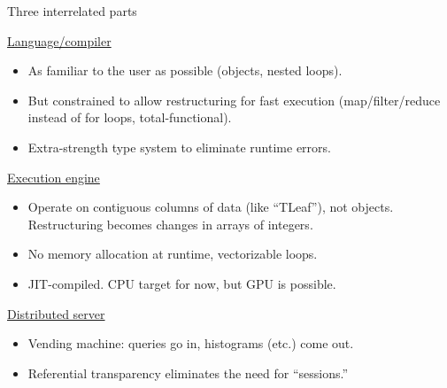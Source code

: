 \documentclass{beamer}
\begin{document}
\begin{frame}{Three interrelated parts}
\vspace{0.15 cm}
\begin{block}{\underline{Language/compiler}}
\vspace{-0.1 cm}
\begin{itemize}
\item As familiar to the user as possible (objects, nested loops).
\item But constrained to allow restructuring for fast execution (map/filter/reduce instead of for loops, total-functional).
\item Extra-strength type system to eliminate runtime errors.
\end{itemize}
\end{block}

\vspace{-0.2 cm}
\begin{block}{\underline{Execution engine}}
\vspace{-0.1 cm}
\begin{itemize}
\item Operate on contiguous columns of data (like ``TLeaf''), not objects. Restructuring becomes changes in arrays of integers.
\item No memory allocation at runtime, vectorizable loops.
\item JIT-compiled. CPU target for now, but GPU is possible.
\end{itemize}
\end{block}

\vspace{-0.2 cm}
\begin{block}{\underline{Distributed server}}
\vspace{-0.1 cm}
\begin{itemize}
\item Vending machine: queries go in, histograms (etc.) come out.
\item Referential transparency eliminates the need for ``sessions.''
\end{itemize}
\end{block}
\end{frame}
\end{document}
